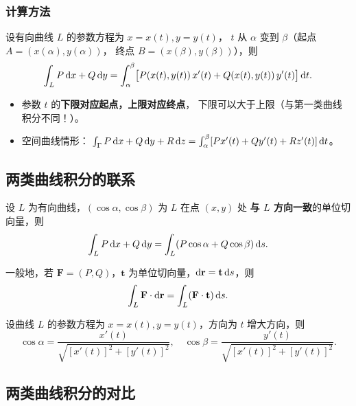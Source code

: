 \documentclass{article}
\begin{document}
\subsubsection*{计算方法}

\begin{theorem}[第二类曲线积分的计算]
  设有向曲线 $L$ 的参数方程为 $x = x(t), y = y(t)$，
  $t$ 从 $\alpha$ 变到 $\beta$（起点 $A = (x(\alpha), y(\alpha))$，
  终点 $B = (x(\beta), y(\beta))$），则
  \[
    \int_L P \,\mathrm{d} x + Q \,\mathrm{d} y
    = \int_\alpha^\beta \bigl[ P(x(t),y(t))\,x'(t) +
    Q(x(t),y(t))\,y'(t) \bigr] \,\mathrm{d} t.
  \]
\end{theorem}

\begin{remark}[第二类曲线积分计算要点]
  \begin{itemize}
    \item 参数 $t$ 的\textbf{下限对应起点，上限对应终点}，
      下限可以大于上限（与第一类曲线积分不同！）。
    \item 空间曲线情形：
      $\int_\Gamma P\,\mathrm{d} x + Q\,\mathrm{d} y + R\,\mathrm{d} z
      = \int_\alpha^\beta [Px'(t) + Qy'(t) + Rz'(t)] \,\mathrm{d} t$。
  \end{itemize}
\end{remark}

\subsection{两类曲线积分的联系}

设 $L$ 为有向曲线，$(\cos\alpha, \cos\beta)$ 为 $L$ 在点 $(x,y)$ 处
\textbf{与 $L$ 方向一致}的单位切向量，则
\[
  \int_L P \,\mathrm{d} x + Q \,\mathrm{d} y
  = \int_L (P\cos\alpha + Q\cos\beta) \,\mathrm{d} s.
\]

一般地，若 $\mathbf{F} = (P, Q)$，$\mathbf{t}$ 为单位切向量，$\mathrm{d}\mathbf{r} =
\mathbf{t} \,\mathrm{d} s$，则
\[
  \int_L \mathbf{F} \cdot \mathrm{d}\mathbf{r}
  = \int_L (\mathbf{F} \cdot \mathbf{t}) \,\mathrm{d} s.
\]

\begin{remark}[方向余弦的确定]
  设曲线 $L$ 的参数方程为 $x = x(t), y = y(t)$，方向为 $t$ 增大方向，则
  \[
    \cos\alpha = \frac{x'(t)}{\sqrt{[x'(t)]^2+[y'(t)]^2}}, \quad
    \cos\beta = \frac{y'(t)}{\sqrt{[x'(t)]^2+[y'(t)]^2}}.
  \]
\end{remark}

\subsection{两类曲线积分的对比}
\end{document}
